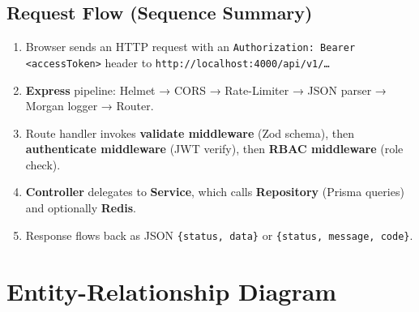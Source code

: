 \documentclass[12pt,a4paper]{report}
\begin{document}
\subsection{Request Flow (Sequence Summary)}
\begin{enumerate}
  \item Browser sends an HTTP request with an \texttt{Authorization: Bearer <accessToken>}
    header to \texttt{http://localhost:4000/api/v1/\ldots}
  \item \textbf{Express} pipeline: Helmet → CORS → Rate-Limiter → JSON parser →
    Morgan logger → Router.
  \item Route handler invokes \textbf{validate middleware} (Zod schema), then
    \textbf{authenticate middleware} (JWT verify), then \textbf{RBAC middleware} (role
    check).
  \item \textbf{Controller} delegates to \textbf{Service}, which calls
    \textbf{Repository} (Prisma queries) and optionally \textbf{Redis}.
  \item Response flows back as JSON \texttt{\{status, data\}} or \texttt{\{status, message, code\}}.
\end{enumerate}

\section{Entity-Relationship Diagram}
\end{document}

